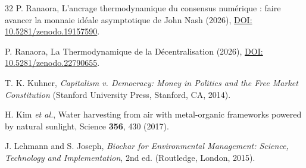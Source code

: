 \documentclass[aps,pre,twocolumn,10pt,superscriptaddress,amsmath,amssymb,amsfonts,floatfix,showkeys]{revtex4-2}
\begin{document}
\begin{thebibliography}{32}
P. Ranaora, L'ancrage thermodynamique du consensus num\'erique : faire avancer la monnaie id\'eale asymptotique de John Nash (2026), \href{https://doi.org/10.5281/zenodo.19157590}{DOI: 10.5281/zenodo.19157590}.

P. Ranaora, La Thermodynamique de la D\'ecentralisation (2026), \href{https://doi.org/10.5281/zenodo.22790655}{DOI: 10.5281/zenodo.22790655}.

T. K. Kuhner, \textit{Capitalism v. Democracy: Money in Politics and the Free Market Constitution} (Stanford University Press, Stanford, CA, 2014).

H. Kim \textit{et al.}, Water harvesting from air with metal-organic frameworks powered by natural sunlight, Science \textbf{356}, 430 (2017).

J. Lehmann and S. Joseph, \textit{Biochar for Environmental Management: Science, Technology and Implementation}, 2nd ed. (Routledge, London, 2015).

\end{thebibliography}
\end{document}
